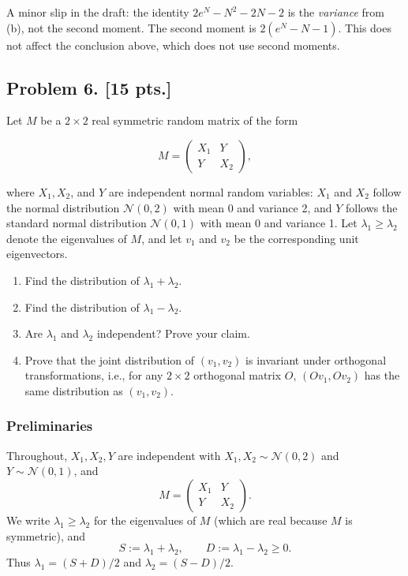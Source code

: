 \documentclass[11pt,a4paper]{article}
\begin{document}
\begin{note*}
A minor slip in the draft: the identity \(2e^N-N^2-2N-2\) is the \emph{variance} from (b), not the second moment. The second moment is \(2(e^N-N-1)\). This does not affect the conclusion above, which does not use second moments.
\end{note*}

\subsection{Problem 6. [15 pts.]}
Let \( M \) be a \( 2 \times 2 \) real symmetric random matrix of the form

\[
M = \begin{pmatrix} X_1 & Y \\ Y & X_2 \end{pmatrix},
\]

where \( X_1, X_2 \), and \( Y \) are independent normal random variables: \( X_1 \) and \( X_2 \) follow the normal distribution \( \mathcal{N}(0, 2) \) with mean 0 and variance 2, and \( Y \) follows the standard normal distribution \( \mathcal{N}(0, 1) \) with mean 0 and variance 1. Let \( \lambda_1 \ge \lambda_2 \) denote the eigenvalues of \( M \), and let \( v_1 \) and \( v_2 \) be the corresponding unit eigenvectors.
\begin{enumerate}[label=(\alph*)]
    \item Find the distribution of \( \lambda_1 + \lambda_2 \).
    \item Find the distribution of \( \lambda_1 - \lambda_2 \).
    \item Are \( \lambda_1 \) and \( \lambda_2 \) independent? Prove your claim.
    \item Prove that the joint distribution of \( (v_1, v_2) \) is invariant under orthogonal transformations, i.e., for any \( 2 \times 2 \) orthogonal matrix \( O \), \( (O v_1, O v_2) \) has the same distribution as \( (v_1, v_2) \).
\end{enumerate}

\setcounter{section}{6}
\setcounter{theorem}{0}
\setcounter{definition}{0}
\setcounter{remark}{0}
\setcounter{note}{0}

\subsubsection{Preliminaries}

Throughout, \(X_1,X_2,Y\) are independent with \(X_1,X_2\sim\mathcal{N}(0,2)\) and \(Y\sim\mathcal{N}(0,1)\), and
\[
M
=
\begin{pmatrix} X_1 & Y \\ Y & X_2 \end{pmatrix}.
\]
We write \(\lambda_1\ge\lambda_2\) for the eigenvalues of \(M\) (which are real because \(M\) is symmetric), and
\[
S:=\lambda_1+\lambda_2,
\qquad
D:=\lambda_1-\lambda_2\ge 0.
\]
Thus \(\lambda_1=(S+D)/2\) and \(\lambda_2=(S-D)/2\).
\end{document}
